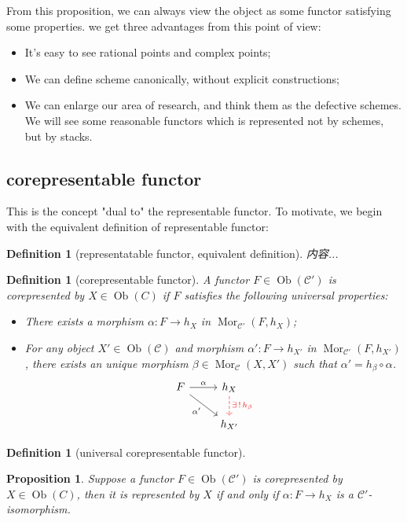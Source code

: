 \documentclass[reqno,11pt]{amsart}
\numberwithin{equation}{section}
\theoremstyle{plain}
\newtheorem{proposition}[theorem]{Proposition}
\newtheorem{defn}[theorem]{Definition}
\theoremstyle{plain}
\numberwithin{equation}{section}
\theoremstyle{remark}
\newcommand{\Ob}{\operatorname{Ob}}
\newcommand{\Mor}{\operatorname{Mor}}
\begin{document}
From this proposition, we can always view the object as some functor satisfying some properties. we get three advantages from this point of view:
\begin{itemize}
\item It's easy to see rational points and complex points;
\item We can define scheme canonically, without explicit constructions;
\item We can enlarge our area of research, and think them as the defective schemes. We will see some reasonable functors which is represented not by schemes, but by stacks.
\end{itemize}
\subsection{corepresentable functor}
This is the concept "dual to" the representable functor. To motivate, we begin with the equivalent definition of representable functor:
\begin{defn}[representatable functor, equivalent definition]
内容...
\end{defn}
\begin{defn}[corepresentable functor]
A functor $F\in \Ob(\mathcal{C}')$ is corepresented by $X \in \Ob(C)$ if $F$ satisfies the following universal properties:
\begin{itemize}
\item There exists a morphism $\alpha:F \longrightarrow h_X$ in $\Mor_{\mathcal{C}'}(F,h_X)$;
\item For any object $X' \in \Ob(\mathcal{C})$ and morphism $\alpha':F\longrightarrow h_{X'}$ in $\Mor_{\mathcal{C}'}(F,h_{X'})$, there exists an unique morphism $\beta \in \Mor_{\mathcal{C}}(X,X')$ such that $\alpha'=h_{\beta} \circ \alpha$.
$$\begin{tikzcd}
	F & {h_X} \\
	& {h_{X'}}
	\arrow["\alpha", from=1-1, to=1-2]
	\arrow["{\exists \,! \,h_{\beta}}", color={rgb,255:red,255;green,0;blue,8}, dashed, from=1-2, to=2-2]
	\arrow["{\alpha'}"', from=1-1, to=2-2]
\end{tikzcd}$$
\end{itemize}
\end{defn}
\begin{defn}[universal corepresentable functor]

\end{defn}
\begin{proposition}
Suppose a functor $F\in \Ob(\mathcal{C}')$ is corepresented by $X \in \Ob(C)$, then it is represented by $X$ if and only if $\alpha:F \longrightarrow h_X$ is a $\mathcal{C}'$-isomorphism.
\end{proposition}
\end{document}
